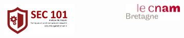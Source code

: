 \date[\uversion]{Publication \INFODistrib ~du \\ \DTMnow}








\begin{frame}[plain]
 					\begin{figure}
  					 \centering
  					 \begin{columns}[c]
  \begin{column}{0.4\textwidth}
  
    \begin{figure}
        \begin{centering}
  			\includegraphics[width=\textwidth]{Tex/template.inc/Commons/CommonsPictures/img-sec101.pdf}
  \end{centering}
  \end{figure}
      \end{column}
  
  \begin{column}{0.6\textwidth}
    \begin{figure}
        \begin{centering}
 		    \includegraphics[width=\textwidth]{Tex/template.inc/Commons/CommonsPictures/cnambretagne.pdf}
    \end{centering}
  \end{figure}
  \end{column}
\end{columns}
   							  
   							  \end{figure}
				  				\titlepage
\end{frame}
